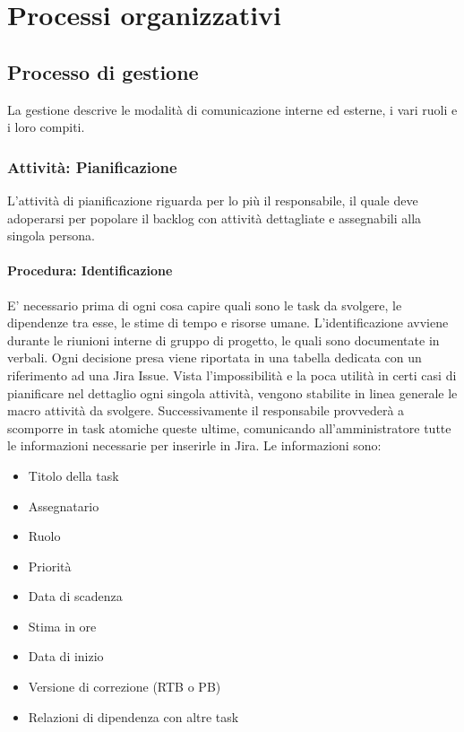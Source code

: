 \documentclass[a4paper,12pt]{article}
\begin{document}
\section{Processi organizzativi}
\subsection{Processo di gestione} \label{gestione_processi_organizzativi}
La gestione descrive le modalità di comunicazione interne ed esterne, i vari
ruoli e i loro compiti.

\subsubsection{Attività: Pianificazione}
L'attività di pianificazione riguarda per lo più il responsabile, il quale deve
adoperarsi per popolare il backlog con attività dettagliate e assegnabili alla
singola persona.
\paragraph{Procedura: Identificazione}\label{identificazioneTaskGestione}
E' necessario prima di ogni cosa capire quali sono le task da svolgere, le
dipendenze tra esse, le stime di tempo e risorse umane. L'identificazione
avviene durante le riunioni interne di gruppo di progetto, le quali sono
documentate in verbali. Ogni decisione presa viene riportata in una tabella
dedicata con un riferimento ad una Jira Issue. Vista l'impossibilità e la poca
utilità in certi casi di pianificare nel dettaglio ogni singola attività, vengono stabilite in
linea generale le macro attività da svolgere. Successivamente il responsabile
provvederà a scomporre in task atomiche queste ultime, comunicando
all'amministratore tutte le informazioni necessarie per inserirle in Jira. Le
informazioni sono:
\begin{itemize}
    \item Titolo della task
    \item Assegnatario
    \item Ruolo
    \item Priorità
    \item Data di scadenza
    \item Stima in ore
    \item Data di inizio
    \item Versione di correzione (RTB o PB)
    \item Relazioni di dipendenza con altre task
\end{itemize}
\end{document}
